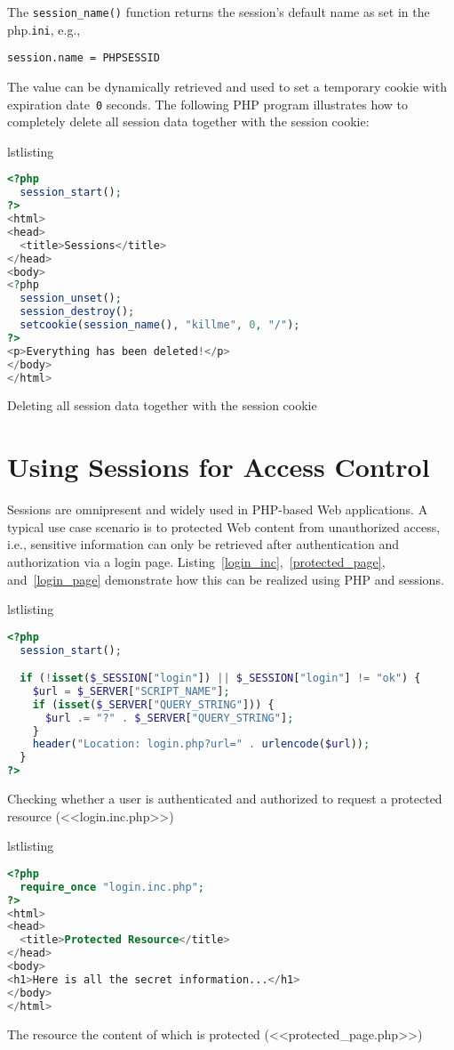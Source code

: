 \documentclass[a4paper, justified, notoc]{tufte-handout} %
\makeatletter
\newenvironment{listing}[1][htbp]
  {\ifvmode\else\unskip\fi\begin{@tufte@float}[#1]{lstlisting}{}}
  {\end{@tufte@float} } %
\makeatother
\begin{document}
The \texttt{session\_name()} function returns the session's default name as set in the php.\texttt{ini}, e.g., 
\begin{Verbatim}
session.name = PHPSESSID
\end{Verbatim}
The value can be dynamically retrieved and used to set a temporary cookie with expiration date~\texttt{0} seconds.
The following PHP program illustrates how to completely delete all session data together with the session cookie:
\begin{listing}
\begin{lstlisting}[language=PHP]
<?php
  session_start();
?>
<html>
<head>
  <title>Sessions</title>
</head>
<body>
<?php
  session_unset();
  session_destroy();
  setcookie(session_name(), "killme", 0, "/");
?>
<p>Everything has been deleted!</p>
</body>
</html>
\end{lstlisting}
	\caption{Deleting all session data together with the session cookie}
	\label{delete_all_session_data}
\end{listing}


\section{Using Sessions for Access Control} %
\label{sec:using_sessions_for_access_control}
Sessions are omnipresent and widely used in PHP-based Web applications.
A typical use case scenario is to protected Web content from unauthorized access, i.e., sensitive information can only be retrieved after authentication and authorization via a login page.
Listing~\ref{login_inc},~\ref{protected_page}, and~\ref{login_page} demonstrate how this can be realized using PHP and sessions.

\begin{listing}
\begin{lstlisting}[language=PHP]
<?php
  session_start();

  if (!isset($_SESSION["login"]) || $_SESSION["login"] != "ok") {
    $url = $_SERVER["SCRIPT_NAME"];
    if (isset($_SERVER["QUERY_STRING"])) {
      $url .= "?" . $_SERVER["QUERY_STRING"];
    }
    header("Location: login.php?url=" . urlencode($url));
  }
?>
\end{lstlisting}
	\caption{Checking whether a user is authenticated and authorized to request a protected resource (<<login.inc.php>>)}
	\label{login_inc}
\end{listing}


\begin{listing}
\begin{lstlisting}[language=PHP]
<?php
  require_once "login.inc.php";
?>
<html>
<head>
  <title>Protected Resource</title>
</head>
<body>
<h1>Here is all the secret information...</h1>
</body>
</html>
\end{lstlisting}
	\caption{The resource the content of which is protected (<<protected\_page.php>>)}
	\label{protected_page}
\end{listing}
\end{document}
